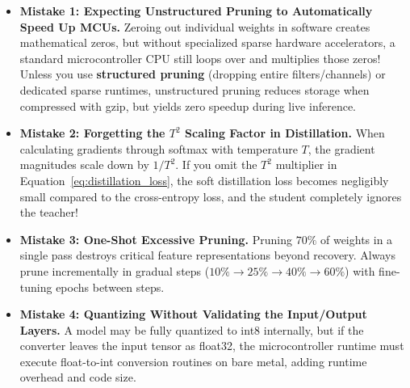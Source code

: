 \begin{warning}
\begin{itemize}
    \item \textbf{Mistake 1: Expecting Unstructured Pruning to Automatically Speed Up MCUs.}
    Zeroing out individual weights in software creates mathematical zeros, but without specialized sparse hardware accelerators, a standard microcontroller CPU still loops over and multiplies those zeros! Unless you use \textbf{structured pruning} (dropping entire filters/channels) or dedicated sparse runtimes, unstructured pruning reduces storage when compressed with gzip, but yields zero speedup during live inference.
    \item \textbf{Mistake 2: Forgetting the $T^2$ Scaling Factor in Distillation.}
    When calculating gradients through softmax with temperature $T$, the gradient magnitudes scale down by $1/T^2$. If you omit the $T^2$ multiplier in Equation~\eqref{eq:distillation_loss}, the soft distillation loss becomes negligibly small compared to the cross-entropy loss, and the student completely ignores the teacher!
    \item \textbf{Mistake 3: One-Shot Excessive Pruning.}
    Pruning $70\%$ of weights in a single pass destroys critical feature representations beyond recovery. Always prune incrementally in gradual steps ($10\% \to 25\% \to 40\% \to 60\%$) with fine-tuning epochs between steps.
    \item \textbf{Mistake 4: Quantizing Without Validating the Input/Output Layers.}
    A model may be fully quantized to int8 internally, but if the converter leaves the input tensor as float32, the microcontroller runtime must execute float-to-int conversion routines on bare metal, adding runtime overhead and code size.
\end{itemize}
\end{warning}

